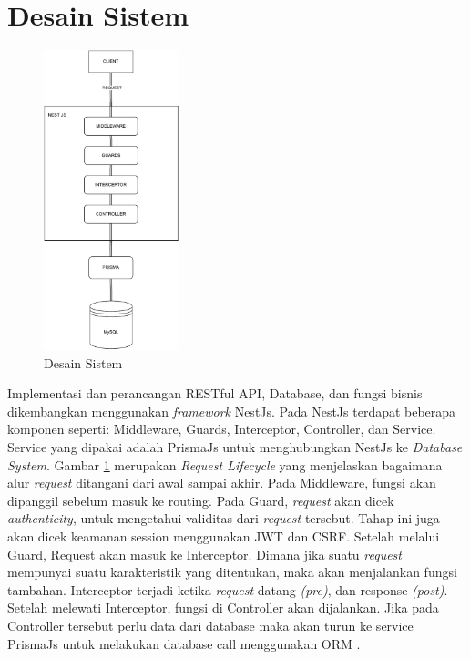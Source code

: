 \section{Desain Sistem}
\begin{figure}[h]
	\centering
	\includegraphics[width=0.35\textwidth]{drawio/sistem-desain.drawio.pdf}
	\caption{Desain Sistem}
	\label{sistem-desain}
\end{figure}
Implementasi dan perancangan RESTful API, Database, dan fungsi bisnis dikembangkan menggunakan \textit{framework} NestJs. Pada NestJs terdapat beberapa komponen seperti: Middleware, Guards, Interceptor, Controller, dan Service. Service yang dipakai adalah PrismaJs untuk menghubungkan NestJs ke \textit{Database System}. Gambar \ref{sistem-desain} merupakan \textit{Request Lifecycle} yang menjelaskan bagaimana alur \textit{request} ditangani dari awal sampai akhir.
Pada Middleware, fungsi akan dipanggil sebelum masuk ke routing. Pada Guard, \textit{request} akan dicek \textit{authenticity}, untuk mengetahui validitas dari \textit{request} tersebut. Tahap ini juga akan dicek keamanan session menggunakan JWT dan CSRF. Setelah melalui Guard, Request akan masuk ke Interceptor. Dimana jika suatu \textit{request} mempunyai suatu karakteristik yang ditentukan, maka akan menjalankan fungsi tambahan. Interceptor terjadi ketika \textit{request} datang \textit{(pre)}, dan response \textit{(post)}. Setelah melewati Interceptor, fungsi di Controller akan dijalankan. Jika pada Controller tersebut perlu data dari database maka akan turun ke service PrismaJs untuk melakukan database call menggunakan ORM \cite{NestJS}.

